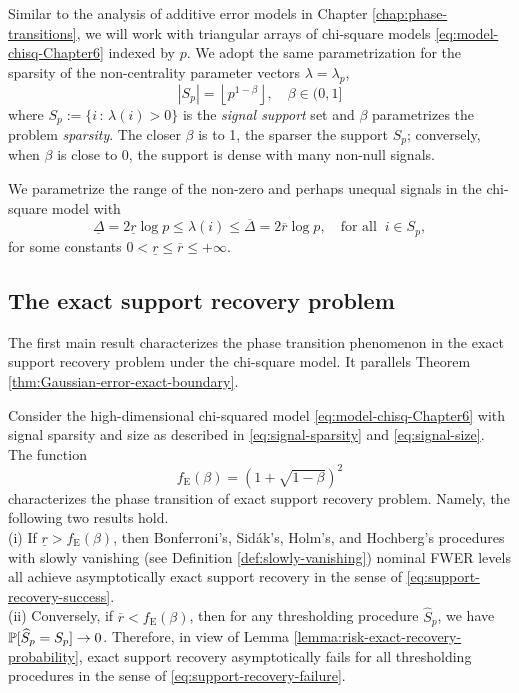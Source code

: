 
Similar to the analysis of additive error models in Chapter \ref{chap:phase-transitions}, we will work with triangular arrays of chi-square models \eqref{eq:model-chisq-Chapter6} indexed by $p$.
We adopt the same parametrization for the sparsity of the non-centrality parameter vectors $\lambda = \lambda_p$,
\begin{equation} \label{eq:signal-sparsity}
    |S_p| = \left\lfloor p^{1-\beta} \right\rfloor, \quad \beta\in(0,1]
\end{equation}
where $S_p:= \{ i\, :\, \lambda(i) >0 \}$ is the {\em signal support} set and  $\beta$ parametrizes the problem {\em sparsity}.
The closer $\beta$ is to 1, the sparser the support $S_p$; conversely, when $\beta$ is close to 0, the support is dense with many non-null signals.

We parametrize the range of the non-zero and perhaps unequal signals in the chi-square model with
\begin{equation} \label{eq:signal-size}
    \underline{\Delta} = 2\underline{r}\log{p}
    \le \lambda(i) \le
    \overline{\Delta} = 2\overline{r}\log{p}, \quad \text{for all}\;\;i\in S_p,
\end{equation}
for some constants $0<\underline{r}\le\overline{r}\le+\infty$.

\subsection{The exact support recovery problem}
\label{subsec:exact-support-recovery-chisq}

The first main result characterizes the phase transition phenomenon in the exact support recovery problem under the chi-square model.  It parallels
Theorem \ref{thm:Gaussian-error-exact-boundary}.

\begin{theorem} \label{thm:chi-squared-exact-boundary}
Consider the high-dimensional chi-squared model \eqref{eq:model-chisq-Chapter6} with signal sparsity and size as described in \eqref{eq:signal-sparsity} and \eqref{eq:signal-size}.
The function 
\begin{equation} \label{eq:exact-boundary-chisquared}
    f_{\mathrm{E}}(\beta) = \left(1 + \sqrt{1-\beta}\right)^2
\end{equation}
characterizes the phase transition of exact support recovery problem.
Namely, the following two results hold.\\

{\rm (i)} If $\underline{r} > f_{\mathrm{E}}(\beta)$, then Bonferroni's, Sid\'ak's, Holm's, and Hochberg's procedures with slowly vanishing (see Definition \ref{def:slowly-vanishing}) nominal FWER levels all achieve asymptotically exact support recovery in the sense of \eqref{eq:support-recovery-success}.\\

{\rm (ii)} Conversely, if $\overline{r} < f_{\mathrm{E}}(\beta)$, then for any thresholding procedure $\widehat{S}_p$, we have $\P[\widehat{S}_p=S_p]\to0$.
Therefore, in view of Lemma \ref{lemma:risk-exact-recovery-probability}, exact support recovery asymptotically fails for all thresholding procedures in the sense of \eqref{eq:support-recovery-failure}.
\end{theorem}

